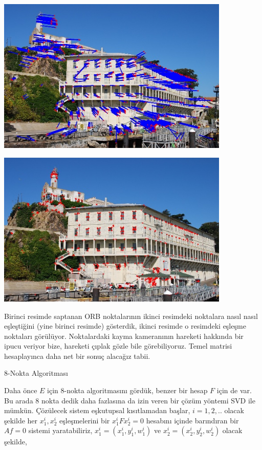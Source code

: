 \documentclass[12pt,fleqn]{article}\usepackage{../../common}
\begin{document}
\includegraphics[width=30em]{vision_20recons_01.jpg}

\includegraphics[width=30em]{vision_20recons_02.jpg}

Birinci resimde saptanan ORB noktalarının ikinci resimdeki noktalara nasıl
nasıl eşleştiğini (yine birinci resimde) gösterdik, ikinci resimde o
resimdeki eşleşme noktaları görülüyor. Noktalardaki kayma kameranının
hareketi hakkında bir ipucu veriyor bize, hareketi çıplak gözle bile
görebiliyoruz. Temel matrisi hesaplayınca daha net bir sonuç alacağız
tabii.

8-Nokta Algoritması

Daha önce $E$ için 8-nokta algoritmasını gördük, benzer bir hesap $F$ için
de var. Bu arada 8 nokta dedik daha fazlasına da izin veren bir çözüm
yöntemi SVD ile mümkün. Çözülecek sistem eşkutupsal kısıtlamadan başlar,
$i=1,2,..$ olacak şekilde her $x_1^i,x_2^i$ eşleşmelerini bir
$x_1^i F x_2^i = 0$ hesabını içinde barındıran bir $Af = 0$ sistemi
yaratabiliriz, $x_1^i = (x_1^i,y_1^i,w_1^i)$ ve $x_2^i=(x_2^i,y_2^i,w_2^i)$
olacak şekilde,
\end{document}
